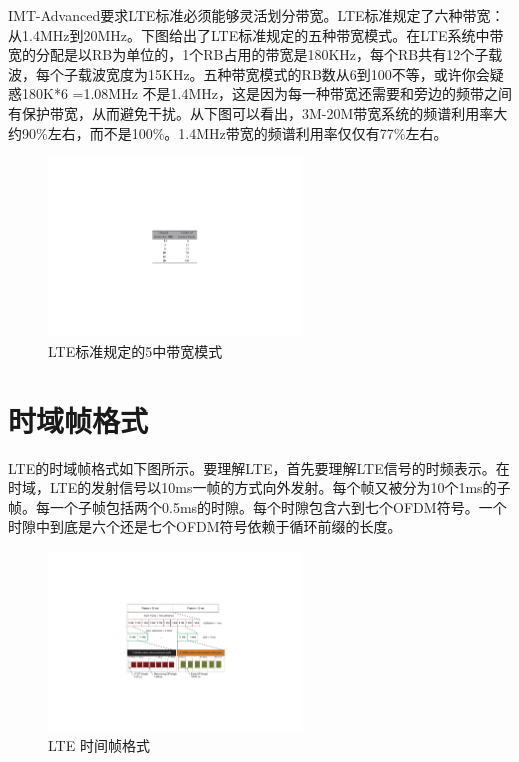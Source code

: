 \documentclass[10pt,a4paper,UTF8]{article}
\begin{document}
IMT-Advanced要求LTE标准必须能够灵活划分带宽。LTE标准规定了六种带宽：从1.4MHz到20MHz。下图给出了LTE标准规定的五种带宽模式。在LTE系统中带宽的分配是以RB为单位的，1个RB占用的带宽是180KHz，每个RB共有12个子载波，每个子载波宽度为15KHz。五种带宽模式的RB数从6到100不等，或许你会疑惑180K*6 =1.08MHz 不是1.4MHz，这是因为每一种带宽还需要和旁边的频带之间有保护带宽，从而避免干扰。从下图可以看出，3M-20M带宽系统的频谱利用率大约90\%左右，而不是100\%。1.4MHz带宽的频谱利用率仅仅有77\%左右。

\begin{figure}[htb]
\centering
\includegraphics[width=0.6\textwidth]{../../img/20151004lte_channel_allocation.pdf}
\caption{\label{fig:orgparagraph1}
LTE标准规定的5中带宽模式}
\end{figure}

\section{时域帧格式}
\label{sec:orgheadline6}


LTE的时域帧格式如下图所示。要理解LTE，首先要理解LTE信号的时频表示。在时域，LTE的发射信号以10ms一帧的方式向外发射。每个帧又被分为10个1ms的子帧。每一个子帧包括两个0.5ms的时隙。每个时隙包含六到七个OFDM符号。一个时隙中到底是六个还是七个OFDM符号依赖于循环前缀的长度。

\begin{figure}[htb]
\centering
\includegraphics[width=0.6\textwidth]{../../img/20150719lte-time-framing.pdf}
\caption{\label{fig:orgparagraph2}
LTE 时间帧格式}
\end{figure}
\end{document}
